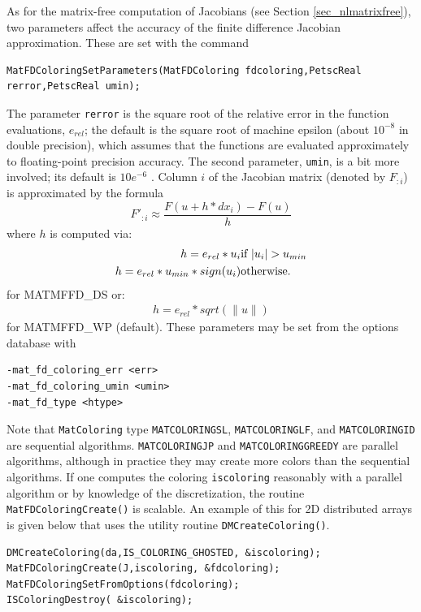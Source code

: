 As for the matrix-free computation of Jacobians (see Section
\ref{sec_nlmatrixfree}), two parameters affect the accuracy of the
finite difference Jacobian approximation.  These are set with the command
\begin{lstlisting}
MatFDColoringSetParameters(MatFDColoring fdcoloring,PetscReal rerror,PetscReal umin);
\end{lstlisting}
The parameter \lstinline{rerror} is the square root of
the relative error in the function evaluations, $e_{rel}$; the default is the square root of machine epsilon (about $10^{-8}$ in double precision), which assumes
that the functions are evaluated approximately to floating-point precision accuracy. The
second parameter, \lstinline{umin}, is a bit more involved; its default is
$ 10e^{-6} $ .  Column $i$ of the Jacobian matrix (denoted by $F_{:i}$) is
approximated by the formula
\[
    F'_{:i} \approx \frac{F(u + h*dx_{i}) - F(u)}{h}
\]
where $ h $ is computed via:
\begin{eqnarray*}
        h = e_{rel}*u_{i}             &    \hbox{if }  |u_{i}| > u_{min} \\
        h = e_{rel}*u_{min}*sign(u_{i})  &    \hbox{otherwise}.
\end{eqnarray*}
for MATMFFD\_DS
or:
\begin{eqnarray*}
        h = e_{rel}*sqrt(\|u\|)
\end{eqnarray*}
for MATMFFD\_WP (default).
These parameters may be set from the options database with
\begin{lstlisting}
-mat_fd_coloring_err <err>
-mat_fd_coloring_umin <umin>
-mat_fd_type <htype>
\end{lstlisting}
  

Note that \lstinline{MatColoring} type \lstinline{MATCOLORINGSL}, \lstinline{MATCOLORINGLF}, and \lstinline{MATCOLORINGID} are sequential algorithms.  \lstinline{MATCOLORINGJP} and
\lstinline{MATCOLORINGGREEDY} are parallel algorithms, although in practice they may create more colors than the sequential
algorithms.  If one computes the coloring \lstinline{iscoloring} reasonably with a parallel algorithm or by knowledge of the
discretization, the routine \lstinline{MatFDColoringCreate()} is scalable.  An example of this for 2D distributed arrays is given
below that uses the utility routine \lstinline{DMCreateColoring()}.

\begin{lstlisting}
DMCreateColoring(da,IS_COLORING_GHOSTED, &iscoloring);
MatFDColoringCreate(J,iscoloring, &fdcoloring); 
MatFDColoringSetFromOptions(fdcoloring);
ISColoringDestroy( &iscoloring);
\end{lstlisting}

